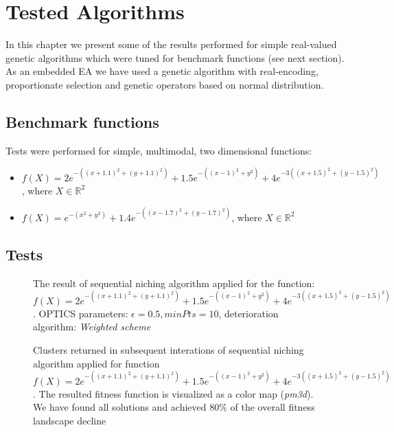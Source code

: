 
\chapter{Tested Algorithms}
\label{TestedAlgorithms}
In this chapter we present some of the results performed for simple
real-valued genetic algorithms which were tuned for benchmark
functions (see next section).
As an embedded EA we have used a genetic
algorithm with real-encoding, proportionate selection and genetic operators 
based on normal distribution.

\section{Benchmark functions}
Tests were performed for simple, multimodal, two dimensional functions:
\begin{itemize}
  \item $f(X) = 2e^{-((x+1.1)^2 + (y+1.1)^2)} + 1.5e^{-((x-1)^2 + y^2)} +
  4e^{-3((x+1.5)^2 + (y-1.5)^2)}$, where $X \in \mathbb{R}^2$
  \item $f(X) = e^{-(x^2 + y^2)}+1.4e^{-((x-1.7)^2 + (y-1.7)^2)}$, where $X \in
  \mathbb{R}^2$
\end{itemize} 

\section{Tests}
\begin{figure}
  \centering
  \caption{The result of sequential niching algorithm applied for the function:
  $f(X) = 2e^{-((x+1.1)^2 + (y+1.1)^2)} + 1.5e^{-((x-1)^2 + y^2)} +
  4e^{-3((x+1.5)^2 + (y-1.5)^2)}$. OPTICS parameters: $\epsilon=0.5,
  minPts=10$, deterioration algorithm: \textit{Weighted scheme}}
  \label{seqNiching1}
\end{figure}

\begin{figure}
  \centering
  \caption{Clusters returned in subsequent interations of sequential
  niching algorithm applied for function
  $f(X) = 2e^{-((x+1.1)^2 + (y+1.1)^2)} + 1.5e^{-((x-1)^2 + y^2)} +
  4e^{-3((x+1.5)^2 + (y-1.5)^2)}$. The resulted fitness function is visualized 
  as a color map (\textit{pm3d}). We have found all solutions and achieved
  $80\%$ of the overall fitness landscape decline}
  \label{seqNichingPop}
\end{figure}

